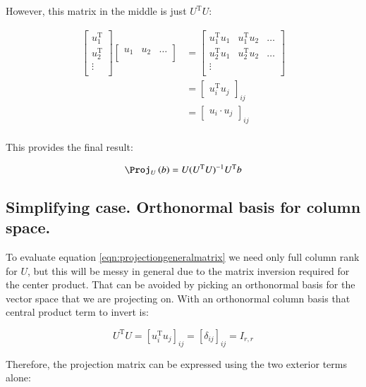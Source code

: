 \documentclass{article}      %
\newcommand{\T}[0]{{\text{T}}}
\begin{document}
However, this matrix in the middle is just $U^\T U$:

\begin{align*}
\begin{bmatrix}
u_1^\T \\
u_2^\T \\
\vdots \\
\end{bmatrix}
\begin{bmatrix}
{u_1} & {u_2} & \hdots \\
\end{bmatrix}
&=
\begin{bmatrix}
u_1^\T {u_1} & u_1^\T {u_2} & \hdots \\
u_2^\T {u_1} & u_2^\T {u_2} & \hdots \\
\vdots & & \\
\end{bmatrix} \\
&=
{
\begin{bmatrix}
u_i^\T {u_j}
\end{bmatrix}
}_{ij} \\
&=
{
\begin{bmatrix}
{u_i} \cdot {u_j}
\end{bmatrix}
}_{ij} \\
\end{align*}

This provides the final result:

\begin{equation}\label{eqn:projectiongeneralmatrix}
\Proj_{U}\left(b\right) = U (U^\T U)^{-1} U^\T b
\end{equation}

\subsection{ Simplifying case.  Orthonormal basis for column space. }

To evaluate equation \ref{eqn:projectiongeneralmatrix} we need only full column rank for $U$, but this will be messy in general due to the matrix inversion required for the center product.  That can be avoided by picking an orthonormal basis for the vector space that we are projecting on.  With an orthonormal column basis that 
central product term to invert is:

\[
U^\T U = [ u_i^\T u_j ]_{ij} = [ \delta_{ij} ]_{ij} = I_{r,r}
\]

Therefore, the projection matrix can be expressed using the two exterior terms alone:
\end{document}
